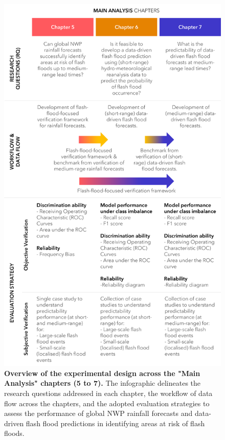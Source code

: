 \begin{figure}[htbp]
\centering
\includegraphics[width=\textwidth]{workflow_dataflow.png}
\caption{\textbf{Overview of the experimental design across the "Main Analysis" chapters (5 to 7).} The infographic delineates the research questions addressed in each chapter, the workflow of data flow across the chapters, and the adopted evaluation strategies to assess the performance of global NWP rainfall forecasts and data-driven flash flood predictions in identifying areas at risk of flash floods.}
\label{fig:workflow_dataflow}
\end{figure}

